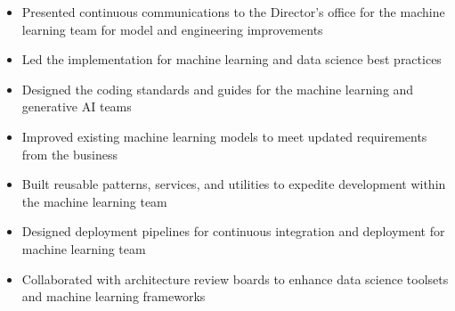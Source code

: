 
\ProjectExperienceExpandedOneSection
{
    \begin{itemize}
        \item Presented continuous communications to the Director’s office for
        the machine learning team for model and engineering improvements
        \item Led the implementation for machine learning and data science best
        practices
        \item Designed the coding standards and guides for the machine learning
        and generative AI teams
        \item Improved existing machine learning models to meet updated
        requirements from the business
        \item Built reusable patterns, services, and utilities to expedite
        development within the machine learning team
        \item Designed deployment pipelines for continuous integration and
        deployment for machine learning team
        \item Collaborated with architecture review boards to enhance data
        science toolsets and machine learning frameworks
    \end{itemize}
}

\vspace*{0.1 in}

